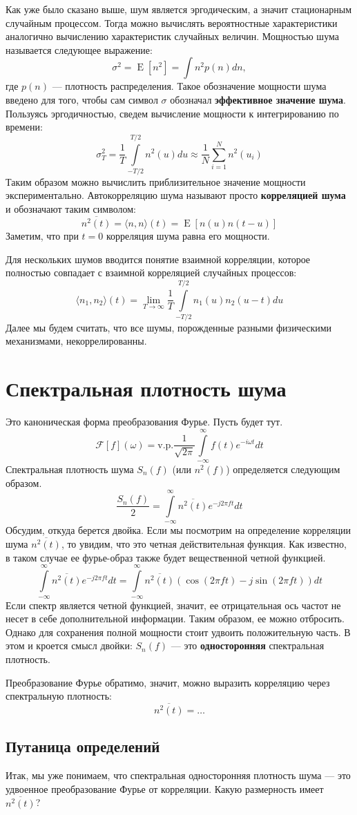 \documentclass[12pt, a4paper]{article}
\DeclareMathOperator{\E}{E}
\begin{document}
Как уже было сказано выше, шум является эргодическим, а значит стационарным случайным процессом. Тогда можно вычислять вероятностные характеристики аналогично вычислению характеристик случайных величин. Мощностью шума называется следующее выражение:
\[
\sigma^2 = \E[n^2] = \int n^2 p(n)dn,
\]
где $p(n)$ — плотность распределения. Такое обозначение мощности шума введено для того, чтобы сам символ $\sigma$ обозначал \textbf{эффективное значение шума}. Пользуясь эргодичностью, сведем вычисление мощности к интегрированию по времени:
\[
\sigma_T^2 = \frac{1}{T}\int\limits^{T/2}_{-T/2}n^2(u)du \approx \frac{1}{N}\sum\limits_{i=1}^N n^2(u_i)
\]
Таким образом можно вычислить приблизительное значение мощности экспериментально. Автокорреляцию шума называют просто \textbf{корреляцией шума} и обозначают таким символом:
\[
\overline{n^2(t)} = \langle n, n \rangle (t) = \E[n(u)n(t-u)]
\]
Заметим, что при $t=0$ корреляция шума равна его мощности.

Для нескольких шумов вводится понятие взаимной корреляции, которое полностью совпадает с взаимной корреляцией случайных процессов:
\[
\langle n_1, n_2 \rangle (t) = \lim\limits_{T \rightarrow\infty}\frac{1}{T}\int\limits_{-T/2}^{T/2}n_1(u)n_2(u-t)du
\]
Далее мы будем считать, что все шумы, порожденные разными физическими механизмами, некоррелированны.

\section*{Спектральная плотность шума}

Это каноническая форма преобразования Фурье. Пусть будет тут.
\[
\mathcal{F}\left[f\right](\omega) = \text{v.p.}\frac{1}{\sqrt{2\pi}}\int\limits_{-\infty}^{\infty}f(t)e^{-i\omega t} dt
\]
Спектральная плотность шума $S_n(f)$ (или $n^2(f)$) определяется следующим образом.
\[
\frac{S_n(f)}{2} =\int\limits_{-\infty}^{\infty}\overline{n^2(t)}e^{-j2\pi ft} dt
\]
Обсудим, откуда берется двойка. Если мы посмотрим на определение корреляции шума $\overline{n^2(t)}$, то увидим, что это четная действительная функция. Как известно, в таком случае ее фурье-образ также будет вещественной четной функцией.
\[
\int\limits_{-\infty}^{\infty}\overline{n^2(t)}e^{-j2\pi ft} dt = \int\limits_{-\infty}^{\infty}\overline{n^2(t)}(\cos(2\pi ft) - j\sin(2\pi ft))dt
\]
Если спектр является четной функцией, значит, ее отрицательная ось частот не несет в себе дополнительной информации. Таким образом, ее можно отбросить. Однако для сохранения полной мощности стоит удвоить положительную часть. В этом и кроется смысл двойки: $S_n(f)$ — это \textbf{односторонняя} спектральная плотность.

Преобразование Фурье обратимо, значит, можно выразить корреляцию через спектральную плотность:
\[
\overline{n^2(t)} = \dots
\]

\subsection*{Путаница определений}
Итак, мы уже понимаем, что спектральная односторонняя плотность шума — это удвоенное преобразование Фурье от корреляции. Какую размерность имеет $\overline{n^2(t)}$?

\end{document}
